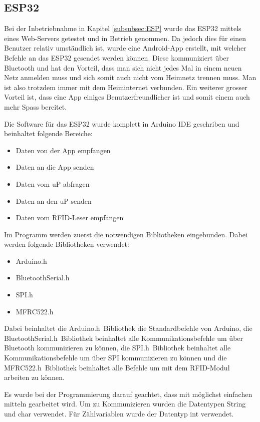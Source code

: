 \subsection{ESP32}
\label{subsec:Software_ESP32}

Bei der Inbetriebnahme in Kapitel \ref{subsubsec:ESP} wurde das ESP32 mittels eines Web-Servers getestet und in Betrieb genommen. Da jedoch dies für einen Benutzer relativ umständlich ist, wurde eine Android-App erstellt, mit welcher Befehle an das ESP32 gesendet werden können. Diese kommuniziert über Bluetooth und hat den Vorteil, dass man sich nicht jedes Mal in einem neuen Netz anmelden muss und sich somit auch nicht vom Heimnetz trennen muss. Man ist also trotzdem immer mit dem Heiminternet verbunden. Ein weiterer grosser Vorteil ist, dass eine App einiges Benutzerfreundlicher ist und somit einem auch mehr Spass bereitet.   

Die Software für das ESP32 wurde komplett in Arduino IDE geschriben und beinhaltet folgende Bereiche:

\begin{itemize}
\item Daten von der App empfangen
\item Daten an die App senden
\item Daten vom uP abfragen
\item Daten an den uP senden 
\item Daten vom RFID-Leser empfangen
\end{itemize}

Im Programm werden zuerst die notwendigen Bibliotheken  eingebunden. Dabei werden folgende Bibliotheken verwendet:

\begin{itemize}
\item Arduino.h
\item BluetoothSerial.h
\item SPI.h
\item MFRC522.h
\end{itemize}

Dabei beinhaltet die \flqq Arduino.h\frqq~Bibliothek die Standardbefehle von Arduino, die \flqq BluetoothSerial.h\frqq~Bibliothek beinhaltet alle Kommunikationsbefehle um über Bluetooth kommunizieren zu können, die \flqq SPI.h\frqq~Bibliothek beinhaltet alle Kommunikationsbefehle um über SPI kommunizieren zu können und die \flqq MFRC522.h\frqq~Bibliothek beinhaltet alle Befehle um mit dem RFID-Modul arbeiten zu können.

Es wurde bei der Programmierung darauf geachtet, dass mit möglichst einfachen mitteln gearbeitet wird. Um zu Kommunizieren wurden die Datentypen String und char verwendet. Für Zählvariablen wurde der Datentyp int verwendet. 